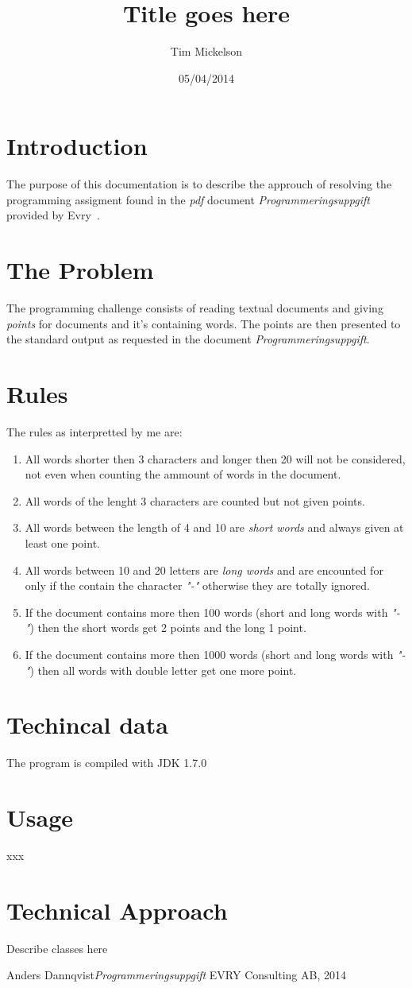 \documentclass[a4paper]{article}
\title{Title goes here}
\author{Tim Mickelson}
\date{05/04/2014}
\begin{document}
\maketitle

\newpage

\section{Introduction}
The purpose of this documentation is to describe the approuch of resolving the programming assigment found in the \textit{pdf} document \textit{Programmeringsuppgift} provided by Evry~\cite{pdf}.

\section{The Problem}
The programming challenge consists of reading textual documents and giving \textit{points} for documents and it's containing words. The points are then presented to the standard output as requested in the
document \textit{Programmeringsuppgift}.

\section{Rules}
The rules as interpretted by me are:
\begin{enumerate}
	\item All words shorter then 3 characters and longer then 20 will not be considered, not even when counting the ammount of words in the document.
	\item All words of the lenght 3 characters are counted but not given points.
	\item All words between the length of 4 and 10 are \textit{short words} and always given at least one point.
	\item All words between 10 and 20 letters are \textit{long words} and are encounted for only if the contain the character \textit{"-"} otherwise they are totally ignored.
	\item If the document contains more then 100 words (short and long words with \textit{"-"}) then the short words get 2 points and the long 1 point.
	\item If the document contains more then 1000 words (short and long words with \textit{"-"}) then all words with double letter get one more point.
\end{enumerate}

\section{Techincal data}
The program is compiled with JDK 1.7.0


\section{Usage}
xxx

\section{Technical Approach}

Describe classes here

\begin{thebibliography}{99}
	Anders Dannqvist\emph{Programmeringsuppgift} EVRY Consulting AB, 2014
\end{thebibliography}
\end{document}

